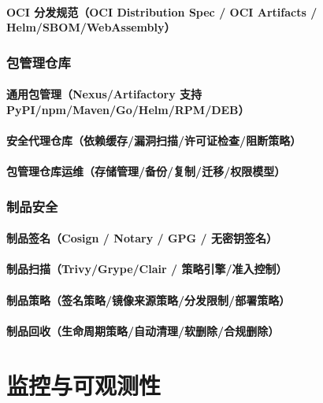 \documentclass[12pt,UTF8]{ctexbook}
\begin{document}
    \subsection{OCI 分发规范（OCI Distribution Spec / OCI Artifacts / Helm/SBOM/WebAssembly）}

  \section{包管理仓库}
    \subsection{通用包管理（Nexus/Artifactory 支持 PyPI/npm/Maven/Go/Helm/RPM/DEB）}
    \subsection{安全代理仓库（依赖缓存/漏洞扫描/许可证检查/阻断策略）}
    \subsection{包管理仓库运维（存储管理/备份/复制/迁移/权限模型）}

  \section{制品安全}
    \subsection{制品签名（Cosign / Notary / GPG / 无密钥签名）}
    \subsection{制品扫描（Trivy/Grype/Clair / 策略引擎/准入控制）}
    \subsection{制品策略（签名策略/镜像来源策略/分发限制/部署策略）}
    \subsection{制品回收（生命周期策略/自动清理/软删除/合规删除）}



\part{监控与可观测性}
\end{document}
